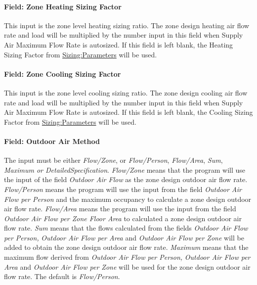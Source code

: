 \paragraph{Field: Zone Heating Sizing Factor}\label{field-zone-heating-sizing-factor-10}

This input is the zone level heating sizing ratio. The zone design heating air flow rate and load will be multiplied by the number input in this field when Supply Air Maximum Flow Rate is autosized. If this field is left blank, the Heating Sizing Factor from \hyperref[sizingparameters]{Sizing:Parameters} will be used.

\paragraph{Field: Zone Cooling Sizing Factor}\label{field-zone-cooling-sizing-factor-9}

This input is the zone level cooling sizing ratio. The zone design cooling air flow rate and load will be multiplied by the number input in this field when Supply Air Maximum Flow Rate is autosized. If this field is left blank, the Cooling Sizing Factor from \hyperref[sizingparameters]{Sizing:Parameters} will be used.

\paragraph{Field: Outdoor Air Method}\label{field-outdoor-air-method-11}

The input must be either \emph{Flow/Zone}, or \emph{Flow/Person}, \emph{Flow/Area}, \emph{Sum}, \emph{Maximum or DetailedSpecification}. \emph{Flow/Zone} means that the program will use the input of the field \emph{Outdoor Air Flow} as the zone design outdoor air flow rate. \emph{Flow/Person} means the program will use the input from the field \emph{Outdoor Air Flow per Person} and the maximum occupancy to calculate a zone design outdoor air flow rate. \emph{Flow/Area} means the program will use the input from the field \emph{Outdoor Air Flow per Zone Floor Area} to calculated a zone design outdoor air flow rate. \emph{Sum} means that the flows calculated from the fields \emph{Outdoor Air Flow per Person,} \emph{Outdoor Air Flow per Area} and \emph{Outdoor Air Flow per Zone} will be added to obtain the zone design outdoor air flow rate. \emph{Maximum} means that the maximum flow derived from \emph{Outdoor Air Flow per Person,} \emph{Outdoor Air Flow per Area} and \emph{Outdoor Air Flow per Zone} will be used for the zone design outdoor air flow rate. The default is \emph{Flow/Person}.

